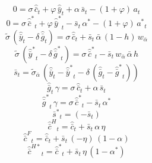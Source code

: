 \begin{dmath}
0={{\sigma}}\, {{\hat {\bar c}}}_{t}+{{\varphi}}\, {{\hat {\bar y}}}_{t}+{{\alpha}}\, {{\bar s}}_{t}-\left(1+{{\varphi}}\right)\, {{a}}_{t}
\end{dmath}
\begin{dmath}
0={{\sigma}}\, {{\hat {\bar c}^*}}_{t}+{{\varphi}}\, {{\hat {\bar y}^*}}_{t}-{{\bar s}}_{t}\, {{\alpha^*}}-\left(1+{{\varphi}}\right)\, {{a^*}}_{t}
\end{dmath}
\begin{dmath}
{{\tilde{\sigma}}}\, \left({{\hat {\bar y}}}_{t}-{{\delta}}\, {{\hat {\bar g}}}_{t}\right)={{\sigma}}\, {{\hat {\bar c}}}_{t}+{{\bar s}}_{t}\, {{\bar{\alpha}}}\, \left(1-{{h}}\right)\, {{w_{\bar{\alpha}}}}
\end{dmath}
\begin{dmath}
{{\tilde{\sigma}}}\, \left({{\hat {\bar y}^*}}_{t}-{{\delta}}\, {{\hat {\bar g}^*}}_{t}\right)={{\sigma}}\, {{\hat {\bar c}^*}}_{t}-{{\bar s}}_{t}\, {{w_{\bar{\alpha}}}}\, {{\bar{\alpha}}}\, {{h}}
\end{dmath}
\begin{dmath}
{{\bar s}}_{t}={{\tilde\sigma_{\bar{\alpha}}}}\, \left({{\hat {\bar y}}}_{t}-{{\hat {\bar y}^*}}_{t}-{{\delta}}\, \left({{\hat {\bar g}}}_{t}-{{\hat {\bar g}^*}}_{t}\right)\right)
\end{dmath}
\begin{dmath}
{{\hat {\bar g}}}_{t}\, {{\gamma}}={{\sigma}}\, {{\hat {\bar c}}}_{t}+{{\alpha}}\, {{\bar s}}_{t}
\end{dmath}
\begin{dmath}
{{\hat {\bar g}^*}}_{t}\, {{\gamma}}={{\sigma}}\, {{\hat {\bar c}^*}}_{t}-{{\bar s}}_{t}\, {{\alpha^*}}
\end{dmath}
\begin{dmath}
{{\bar s^*}}_{t}=\left(-{{\bar s}}_{t}\right)
\end{dmath}
\begin{dmath}
{{\hat {\bar c}^H}}_{t}={{\hat {\bar c}}}_{t}+{{\bar s}}_{t}\, {{\alpha}}\, {{\eta}}
\end{dmath}
\begin{dmath}
{{\hat {\bar c}^F}}_{t}={{\hat {\bar c}}}_{t}+{{\bar s}}_{t}\, \left(-{{\eta}}\right)\, \left(1-{{\alpha}}\right)
\end{dmath}
\begin{dmath}
{{\hat {\bar c}^{H*}}}_{t}={{\hat {\bar c}^*}}_{t}+{{\bar s}}_{t}\, {{\eta}}\, \left(1-{{\alpha^*}}\right)
\end{dmath}
